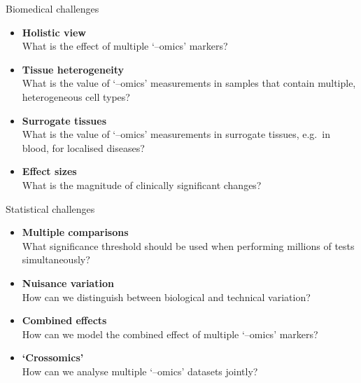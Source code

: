 \begin{frame}{Biomedical challenges}
    \begin{itemize}
        \item \textbf{Holistic view} \\
              What is the effect of multiple `--omics' markers?
        \item \textbf{Tissue heterogeneity} \\
              What is the value of `--omics' measurements in samples that
              contain multiple, heterogeneous cell types?
        \item \textbf{Surrogate tissues} \\
              What is the value of `--omics' measurements in surrogate tissues,
              e.g.\ in blood, for localised diseases?
        \item \textbf{Effect sizes} \\
              What is the magnitude of clinically significant changes?
    \end{itemize}
\end{frame}

\begin{frame}{Statistical challenges}
    \begin{itemize}
        \item \textbf{Multiple comparisons} \\
              What significance threshold should be used when performing
              millions of tests simultaneously?
        \item \textbf{Nuisance variation} \\
              How can we distinguish between biological and technical variation?
        \item \textbf{Combined effects} \\
              How can we model the combined effect of multiple `--omics'
              markers?
        \item \textbf{`Crossomics'} \\
              How can we analyse multiple `--omics' datasets jointly?
    \end{itemize}
\end{frame}




